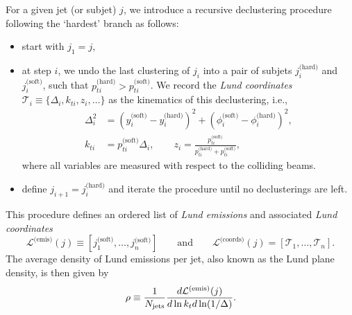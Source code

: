 \documentclass[a4paper,11pt]{article}
\begin{document}
For a given jet (or subjet) $j$, we introduce a recursive declustering procedure following the `hardest' branch as follows:
\begin{itemize}
  \item start with $j_1=j$,
  \item at step $i$, we undo the last clustering of $j_i$ into a pair of subjets $j_i^\text{(hard)}$ and $j_i^\text{(soft)}$, such that $p_{ti}^\text{(hard)}>p_{ti}^\text{(soft)}$. We record the \textit{Lund coordinates} $\mathcal{T}_i\equiv\{\Delta_i,k_{ti},z_i,\dots\}$ as the kinematics of this declustering, i.e.,
  \begin{subequations}\label{eq:z-def}
  \begin{align}
    \Delta^2_i & = (y_i^\text{(soft)}-y_i^\text{(hard)})^2 + (\phi_i^\text{(soft)}-\phi_i^\text{(hard)})^2 , \\
    k_{ti} &= p_{ti}^\text{(soft)}\Delta_{i},   
    \qquad z_i = \frac{p_{ti}^\text{(soft)}}{p_{ti}^\text{(hard)}+p_{ti}^\text{(soft)}},
  \end{align}
  \end{subequations}
  where all variables are measured with respect to the colliding beams. 
  \item define $j_{i+1}=j_i^\text{(hard)}$ and iterate the procedure until no declusterings are left.
\end{itemize}
%
This procedure defines an ordered list of \textit{Lund emissions} and associated \textit{Lund coordinates} 
\begin{equation}
 \mathcal{L}^\text{(emis)}(j)\equiv [j_1^\text{(soft)}, \dots, j_n^\text{(soft)}]
 \qquad\text{and}\qquad \mathcal{L}^\text{(coords)}(j)=[\mathcal{T}_1,\dots,\mathcal{T}_n].
 \end{equation}
%
The average density of Lund emissions per jet, also known as the Lund plane density, is then given by
%
\begin{equation}
\label{eq:LP-density}
\rho \equiv \frac{1}{N_{\rm jets}}\frac{d\mathcal{L}^\text{(emis)}(j)}{d\ln k_t d \ln (1/\Delta)}.
\end{equation}
%
\end{document}
